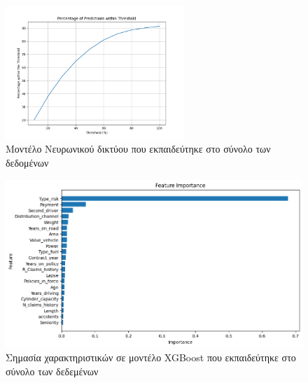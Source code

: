 \documentclass{llncs}
\begin{document}
\begin{figure}
    \begin{center}
        \includegraphics[width=0.6\textwidth]{images/neural_network_all_thresholds.png}
    \end{center}
    \caption{Μοντέλο Νευρωνικού δικτύου που εκπαιδεύτηκε στο σύνολο των δεδομένων}  
    \label{fig:neural_result}  
\end{figure}

\begin{figure}
    \begin{center}
        \includegraphics[width=1\textwidth]{images/feature_importance_combined_xgb.png}
    \end{center}
    \caption{Σημασία χαρακτηριστικών σε μοντέλο XGBoost που εκπαιδεύτηκε στο σύνολο των δεδεμένων}  
    \label{fig:XGBoost_all_feature_importance}  
\end{figure}
\end{document}
